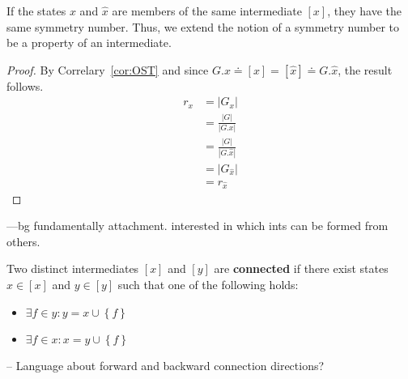 \begin{mythm}
If the states $x$ and $\hat{x}$ are members of the same intermediate $\left[x\right]$, they have the same symmetry number. Thus, we extend the notion of a symmetry number to be a property of an intermediate.
\end{mythm}
\begin{proof}
By Correlary~\ref{cor:OST} and since $G.x \doteq [x] = [\hat{x}] \doteq G.\hat{x}$, the result follows.
\begin{align}
  r_x &= |G_x| \\
  &= \frac{|G|}{|G.x|} \\
  &= \frac{|G|}{|G.\hat{x}|} \\
  &= |G_{\hat{x}}| \\
  &= r_{\hat{x}}
\end{align}
\end{proof}



---bg fundamentally attachment. interested in which ints can be formed from others.

\begin{mydef}
Two distinct intermediates $\left[x\right]$ and $\left[y\right]$ are \textbf{connected} if there exist states $x \in \left[x\right]$ and $y \in \left[y\right]$ such that one of the following holds:
\begin{itemize}
\item $\exists f \in y: y = x \cup \left\{f\right\}$
  \item $\exists f \in x: x = y \cup \left\{f\right\}$
\end{itemize}
\end{mydef}

-- Language about forward and backward connection directions?


